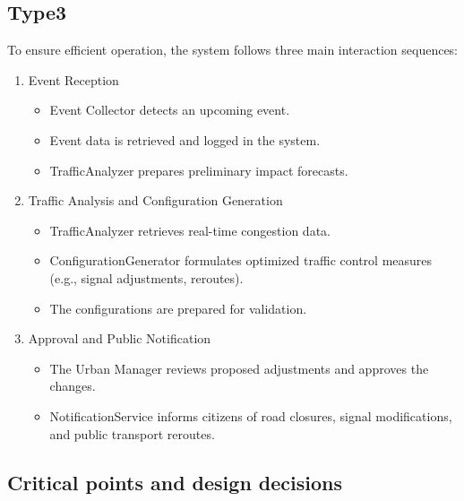 \documentclass[a4paper,12pt]{article}
\begin{document}
\subsection*{Type3}
To ensure efficient operation, the system follows three main interaction sequences:

\begin{enumerate}
    \item {Event Reception}
    \begin{itemize}
        \item Event Collector detects an upcoming event.
        \item Event data is retrieved and logged in the system.
        \item TrafficAnalyzer prepares preliminary impact forecasts.
    \end{itemize}
    \item {Traffic Analysis and Configuration Generation}
    \begin{itemize}
        \item TrafficAnalyzer retrieves real-time congestion data.
        \item ConfigurationGenerator formulates optimized traffic control measures (e.g., signal adjustments, reroutes).
        \item The configurations are prepared for validation.
    \end{itemize}
    \item {Approval and Public Notification}
    \begin{itemize}
        \item The Urban Manager reviews proposed adjustments and approves the changes.
        \item NotificationService informs citizens of road closures, signal modifications, and public transport reroutes.
    \end{itemize}
\end{enumerate}

\newpage

\subsection{Critical points and design decisions}
\end{document}
